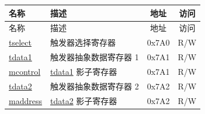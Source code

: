 \begin{longtable}{ | p{4.0cm} | p{8.4cm} | c | c| }
\hline\rowcolor{lightgray}
名称 & 描述 & 地址 & 访问 \\ \hline
\endfirsthead
\hline
\rowcolor{lightgray}
名称 & 描述 & 地址 & 访问 \\ \hline
\endhead
\endfoot

\hyperref[regdesc:LPTSELECT]{tselect} & 触发器选择寄存器 & 0x7A0 & R/W \\\hline
\hyperref[regdesc:LPTDATA1]{tdata1} & 触发器抽象数据寄存器 1 & 0x7A1 & R/W \\\hline
\hyperref[regdesc:LPMCONTROL]{mcontrol} & \hyperref[regdesc:LPTDATA1]{tdata1} 影子寄存器  & 0x7A1 & R/W \\\hline
\hyperref[regdesc:LPTDATA2]{tdata2} & 触发器抽象数据寄存器 2 & 0x7A2 & R/W \\\hline
\hyperref[regdesc:LPMADDRESS]{maddress} & \hyperref[regdesc:LPTDATA2]{tdata2} 影子寄存器 & 0x7A2 & R/W \\\hline
\end{longtable}